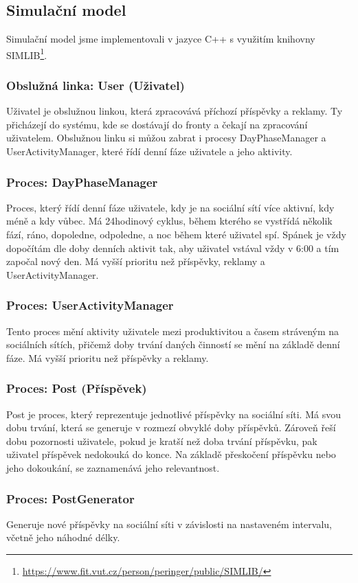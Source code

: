 \documentclass[11pt, a4paper]{article}
\begin{document}
\subsection{Simulační model}
Simulační model jsme implementovali v jazyce C++ s využitím knihovny SIMLIB\footnote{\href{https://www.fit.vut.cz/person/peringer/public/SIMLIB/}{https://www.fit.vut.cz/person/peringer/public/SIMLIB/}}.

\subsubsection{Obslužná linka: User (Uživatel)}
Uživatel je obslužnou linkou, která zpracovává příchozí příspěvky a reklamy. Ty přicházejí do systému, kde se dostávají do fronty a čekají na zpracování uživatelem.
Obslužnou linku si můžou zabrat i procesy DayPhaseManager a UserActivityManager, které řídí denní fáze uživatele a jeho aktivity.
\subsubsection{Proces: DayPhaseManager}
Proces, který řídí denní fáze uživatele, kdy je na sociální sítí více aktivní, kdy méně a kdy vůbec. 
Má 24hodinový cyklus, během kterého se vystřídá několik fází, ráno, dopoledne, odpoledne, a noc během které uživatel spí.
Spánek je vždy dopočítám dle doby denních aktivit tak, aby uživatel vstával vždy v 6:00 a tím započal nový den.
Má vyšší prioritu než příspěvky, reklamy a UserActivityManager.
\subsubsection{Proces: UserActivityManager}
Tento proces mění aktivity uživatele mezi produktivitou a časem stráveným na sociálních sítích, přičemž doby trvání daných činností se mění na základě denní fáze.
Má vyšší prioritu než příspěvky a reklamy. 
\subsubsection{Proces: Post (Příspěvek)}
Post je proces, který reprezentuje jednotlivé příspěvky na sociální síti. Má svou dobu trvání, která se generuje v rozmezí obvyklé doby příspěvků.
Zároveň řeší dobu pozornosti uživatele, pokud je kratší než doba trvání příspěvku, pak uživatel příspěvek nedokouká do konce.
Na základě přeskočení příspěvku nebo jeho dokoukání, se zaznamenává jeho relevantnost.
\subsubsection{Proces: PostGenerator}
Generuje nové příspěvky na sociální síti v závislosti na nastaveném intervalu, včetně jeho náhodné délky.
\end{document}
